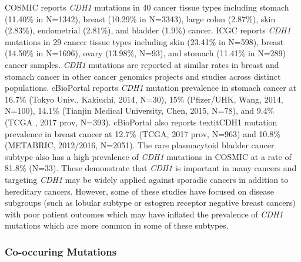 COSMIC reports \textit{CDH1} mutations in 40 cancer tissue types including stomach (11.40\% in N=1342), breast (10.29\% in N=3343), large colon (2.87\%), skin (2.83\%), endometrial (2.81\%), and bladder (1.9\%) cancer. ICGC reports \textit{CDH1} mutations in 29 cancer tissue types including skin (23.41\% in N=598), breast (14.50\% in N=1696), ovary (13.98\%, N=93), and stomach (11.41\% in N=289) cancer samples. \textit{CDH1} mutations are reported at similar rates in breast and stomach cancer in other cancer genomics projects and studies across distinct populations. cBioPortal reports \textit{CDH1} mutation prevalence in stomach cancer at 16.7\% (Tokyo Univ., Kakiuchi, 2014, N=30), 15\% (Pfizer/UHK,  Wang, 2014, N=100), 14.1\% (Tianjin Medical University, Chen, 2015, N=78), and 9.4\% (TCGA , 2017 prov, N=393). cBioPortal also reports textit{CDH1} mutation prevalence in breast cancer at 12.7\% (TCGA, 2017 prov, N=963) and 10.8\% (METABRIC, 2012/2016, N=2051). The rare plasmacytoid bladder cancer subtype also has a high prevalence of \textit{CDH1} mutations in COSMIC at a rate of 81.8\% (N=33). These demonstrate that \textit{CDH1} is important in many cancers and targeting \textit{CDH1} may be widely applied against sporadic cancers in addition to hereditary cancers. However, some of these studies have focused on disease subgroups (such as lobular subtype or estogren receptor negative breast cancers) with poor patient outcomes which may have inflated the prevalence of \textit{CDH1} mutations which are more common in some of these subtypes.

\subsubsection{Co-occuring Mutations}

